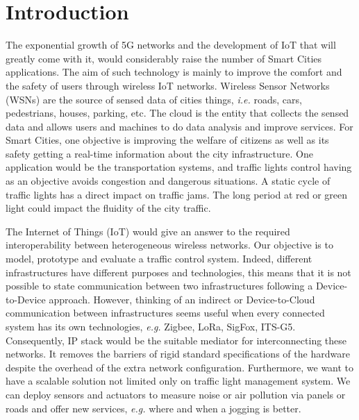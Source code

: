 \section{Introduction}

The exponential growth of 5G networks and the development of IoT that will greatly come with it,
	would considerably raise the number of Smart Cities applications.
The aim of such technology is mainly to improve the comfort and the safety of users through wireless IoT networks.
Wireless Sensor Networks (WSNs) are the source of sensed data of cities things,
	\emph{i.e.}
roads,
	cars,
	pedestrians,
	houses,
	parking,
	etc.
The cloud is the entity that collects the sensed data and allows users and machines to do data analysis and improve services.
For Smart Cities,
	one objective is improving the welfare of citizens as well as its safety getting a real-time information about the city infrastructure.
One application would be the transportation systems,
	and traffic lights control having as an objective avoids congestion and dangerous situations.
A static cycle of traffic lights has a direct impact on traffic jams.
The long period at red or green light could impact the fluidity of the city traffic.

The Internet of Things (IoT) would give an answer to the required interoperability between heterogeneous wireless networks.
Our objective is to model,
	prototype and evaluate a traffic control system.
Indeed,
	different infrastructures have different purposes and technologies,
	this means that it is not possible to state communication between two infrastructures following a Device-to-Device approach.
However,
	thinking of an indirect or Device-to-Cloud communication between infrastructures seems useful when every connected system has its own technologies,
	\textit{e.g.} Zigbee,
	LoRa,
	SigFox,
	ITS-G5.
Consequently,
	IP stack would be the suitable mediator for interconnecting these networks.
It removes the barriers of rigid standard specifications of the hardware despite the overhead of the extra network configuration.
Furthermore,
	we want to have a scalable solution not limited only on traffic light management system.
We can deploy sensors and actuators to measure noise or air pollution via panels or roads and offer new services,
	\textit{e.g.} where and when a jogging is better.

